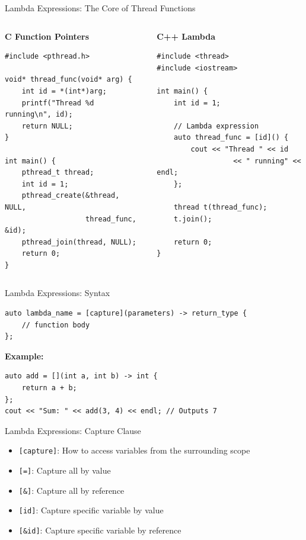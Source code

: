 \begin{frame}[fragile]{Lambda Expressions: The Core of Thread Functions}
	\begin{columns}
		\begin{column}{0.5\textwidth}
			\textbf{C Function Pointers}
			\begin{verbatim}
#include <pthread.h>

void* thread_func(void* arg) {
    int id = *(int*)arg;
    printf("Thread %d running\n", id);
    return NULL;
}

int main() {
    pthread_t thread;
    int id = 1;
    pthread_create(&thread, NULL,
                   thread_func, &id);
    pthread_join(thread, NULL);
    return 0;
}
			\end{verbatim}
		\end{column}
		\begin{column}{0.5\textwidth}
			\textbf{C++ Lambda}
			\begin{verbatim}
#include <thread>
#include <iostream>

int main() {
    int id = 1;

    // Lambda expression
    auto thread_func = [id]() {
        cout << "Thread " << id
                  << " running" << endl;
    };

    thread t(thread_func);
    t.join();

    return 0;
}
			\end{verbatim}
		\end{column}
	\end{columns}

\end{frame}

\begin{frame}[fragile]{Lambda Expressions: Syntax}
    \begin{verbatim}
auto lambda_name = [capture](parameters) -> return_type {
    // function body
};
    \end{verbatim}
    \textbf{Example:}
    \begin{verbatim}
auto add = [](int a, int b) -> int {
    return a + b;
};
cout << "Sum: " << add(3, 4) << endl; // Outputs 7
    \end{verbatim}
\end{frame}

\begin{frame}[fragile]{Lambda Expressions: Capture Clause}
    \begin{itemize}
        \item \texttt{[capture]}: How to access variables from the surrounding scope
        \item \texttt{[=]}: Capture all by value
        \item \texttt{[\&]}: Capture all by reference
        \item \texttt{[id]}: Capture specific variable by value
        \item \texttt{[\&id]}: Capture specific variable by reference
    \end{itemize}
\end{frame}

